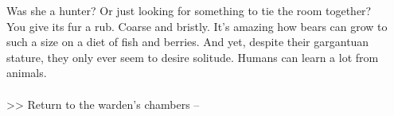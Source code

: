Was she a hunter? Or just looking for something to tie the room together?\\

You give its fur a rub. Coarse and bristly. It’s amazing how bears can grow to such a size on a diet of fish and berries. And yet, despite their gargantuan stature, they only ever seem to desire solitude. Humans can learn a lot from animals.\\
\\

>> Return to the warden’s chambers -- 